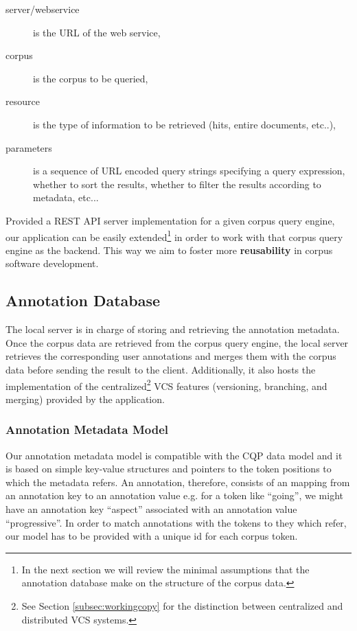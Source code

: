 \documentclass{sig-alternate}
\begin{document}
\begin{description}
\item [server/webservice] is the URL of the web service,
\item [corpus] is the corpus to be queried,
\item [resource] is the type of information to be retrieved (hits, entire documents, etc..),
\item [parameters] is a sequence of URL encoded query strings specifying a query expression,
  whether to sort the results, whether to filter the results according to metadata, etc...
\end{description}

Provided a REST API server implementation for a given corpus query engine, our application can
be easily extended\footnote{
  In the next section we will review the minimal assumptions that the annotation database make on
the structure of the corpus data.
} in order to work with that corpus query engine as the backend. This way we aim to foster 
more \textbf{reusability} in corpus software development.

\subsection{Annotation Database}\label{subsec:db}
The local server is in charge of storing and retrieving the annotation metadata. Once the corpus data
are retrieved from the corpus query engine, the local server retrieves the corresponding user
annotations and merges them with the corpus data before sending the result to the client.
Additionally, it also hosts the implementation of the centralized\footnote{
  See Section \ref{subsec:workingcopy} for the distinction between centralized and distributed
  VCS systems.
} VCS features (versioning, branching, and merging) provided by the application.

\subsubsection{Annotation Metadata Model}\label{subsec:datamodel}

Our annotation metadata model is compatible with the CQP data model \cite{Christ1999} and
it is based on simple key-value structures and pointers to the token
positions to which the metadata refers. An annotation, therefore, consists of an mapping from
an annotation key to an annotation value \textemdash e.g. for a token like ``going'', we might
have an annotation key ``aspect'' associated with an annotation value ``progressive''.
In order to match annotations with the tokens to they which refer, our model has to be provided
with a unique id for each corpus token.
\end{document}
